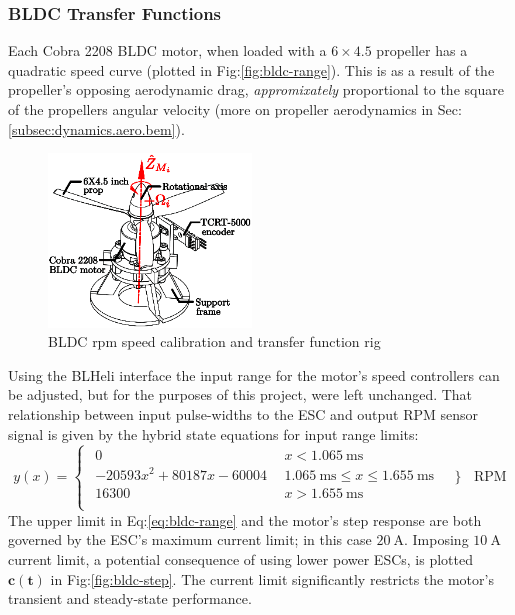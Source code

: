 \subsubsection*{BLDC Transfer Functions}
Each Cobra 2208 BLDC motor, when loaded with a $6\times4.5$ propeller has a quadratic speed curve (plotted in Fig:\ref{fig:bldc-range}). This is as a result of the propeller's opposing aerodynamic drag, \emph{appromixately} proportional to the square of the propellers angular velocity (more on propeller aerodynamics in Sec:\ref{subsec:dynamics.aero.bem}).
\begin{figure}[htbp]
\centering
\includegraphics[width=0.48\textwidth]{figs/bldc-rpm}
\caption{BLDC rpm speed calibration and transfer function rig}
\label{fig:bldc-rpm}
\vspace{-16pt}
\end{figure}
\par
Using the BLHeli interface the input range for the motor's speed controllers can be adjusted, but for the purposes of this project, were left unchanged. That relationship between input pulse-widths to the ESC and output RPM sensor signal is given by the hybrid state equations for input range limits:
\begin{equation}
y(x)=
\begin{cases}\begin{array}{ll}
0 & ~~x<1.065~\text{ms}\\
-20593x^2 + 80187x - 60004 & ~~1.065~\text{ms} \leq x \leq 1.655~\text{ms}\\
16300 & ~~x>1.655~\text{ms}\\
\end{array}
\end{cases}
~~~\Bigg\}~~~~\text{RPM}
\label{eq:bldc-range}
\end{equation}
The upper limit in Eq:\ref{eq:bldc-range} and the motor's step response are both governed by the ESC's maximum current limit; in this case $20~\text{A}$. Imposing $10~\text{A}$ current limit, a potential consequence of using lower power ESCs, is plotted {\color{YellowGreen}$\mathbf{c(t)}$} in Fig:\ref{fig:bldc-step}. The current limit significantly restricts the motor's transient and steady-state performance. 
